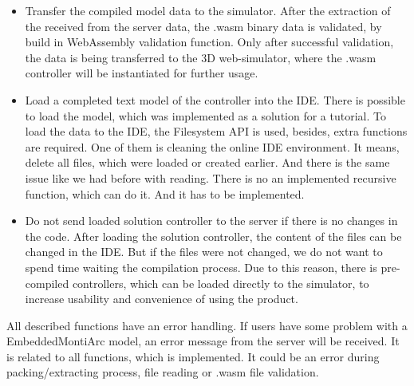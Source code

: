 \begin{itemize}
    \item Transfer the compiled model data to the simulator. After the extraction of the received from the server data, the .wasm binary data is validated, by build in WebAssembly validation function. Only after successful validation, the data is being transferred to the 3D web-simulator, where the .wasm controller will be instantiated for further usage.
    \item Load a completed text model of the controller into the IDE. There is possible to load the model, which was implemented as a solution for a tutorial. To load the data to the IDE, the Filesystem API is used, besides, extra functions are required. One of them is cleaning the online IDE environment. It means, delete all files, which were loaded or created earlier. And there is the same issue like we had before with reading. There is no an implemented recursive function, which can do it. And it has to be implemented.
    \item Do not send loaded solution controller to the server if there is no changes in the code. After loading the solution controller, the content of the files can be changed in the IDE. But if the files were not changed, we do not want to spend time waiting the compilation process. Due to this reason, there is pre-compiled controllers, which can be loaded directly to the simulator, to increase usability and convenience of using the product.
\end{itemize}
All described functions have an error handling. If users have some problem with a EmbeddedMontiArc model, an error message from the server will be received. It is related to all functions, which is implemented. It could be an error during packing/extracting process, file reading or .wasm file validation.


